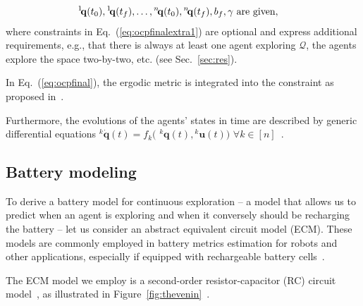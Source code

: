 \documentclass[letterpaper,10pt,conference,twoside]{IEEEtran}
\theoremstyle{definition}
\begin{document}
\begin{subequations}
\begin{align}
  {}^1\hspace*{-.4ex}\mathbf{q}&(t_0),{}^1\hspace*{-.4ex}\mathbf{q}(t_f),\dots,{}^n\hspace*{-.4ex}\mathbf{q}(t_0),{}^n\hspace*{-.4ex}\mathbf{q}(t_f),b_f,\gamma\text{ are given},\label{eq:ocpgivenconst}
\end{align}\end{subequations}
where constraints in Eq.~(\ref{eq:ocpfinalextra1}) are optional and express additional requirements, e.g., that there is always at least one agent exploring $\mathcal{Q}$, the agents explore the space two-by-two, etc. (see Sec.~\ref{sec:res}).

In Eq.~(\ref{eq:ocpfinal}), the ergodic metric is integrated into the constraint as proposed in~\cite{dong2023time}. 

Furthermore, the evolutions of the agents' states in time are described by generic differential equations ${}^k\dot{\mathbf{q}}(t)=f_k($ ${}^k\mathbf{q}(t),{}^k\mathbf{u}(t))$ $\forall k\in[n]$~\cite{abraham2018decentralized}.


\subsection{Battery modeling}\label{sec:batt}
\noindent
To derive a battery model for continuous exploration -- a model that allows us to predict when an agent is exploring and when it conversely should be recharging the battery -- let us consider an abstract equivalent circuit model (ECM). These models are commonly employed in battery metrics estimation for robots and other applications, especially if equipped with rechargeable battery cells~\cite{zhang2018online,xiaosong2012comparative,hasan2018exogenous,hinz2019comparison,mousavi2014various,seewald2022energy}.

The ECM model we employ is a second-order resistor-capacitor (RC) circuit model~\cite{zhao2017observability}, as illustrated in Figure~\ref{fig:thevenin}~\cite{seewaldphdthesis}. 
\end{document}
